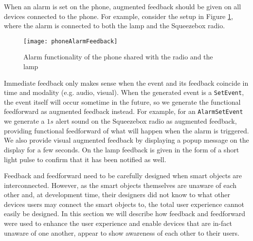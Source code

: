 When an alarm is set on the phone, augmented feedback should be given on all devices connected to the phone. For example, consider the setup in Figure \ref{phoneAlarmFeedback}, where the alarm is connected to both the lamp and the Squeezebox radio. 

\begin{figure}
\centering
\texttt{[image: phoneAlarmFeedback]}
\caption{Alarm functionality of the phone shared with the radio and the lamp}
\label{phoneAlarmFeedback}
\end{figure}

Immediate feedback only makes sense when the event and its feedback coincide in time and modality (e.g. audio, visual). When the generated event is a \texttt{SetEvent}, the event itself will occur sometime in the future, so we generate the functional feedforward as augmented feedback instead. For example, for an \texttt{AlarmSetEvent} we generate a $1s$ alert sound on the Squeezebox radio as augmented feedback, providing functional feedforward of what will happen when the alarm is triggered. We also provide visual augmented feedback by displaying a popup message on the display for a few seconds. On the lamp feedback is given in the form of a short light pulse to confirm that it has been notified as well.

Feedback and feedforward need to be carefully designed when smart objects are interconnected. However, as the smart objects themselves are unaware of each other and, at development time, their designers did not know to what other devices users may connect the smart objects to, the total user experience cannot easily be designed.  In this section we will describe how feedback and feedforward were used to enhance the user experience and enable devices that are in-fact unaware of one another, appear to show awareness of each other to their users. 

